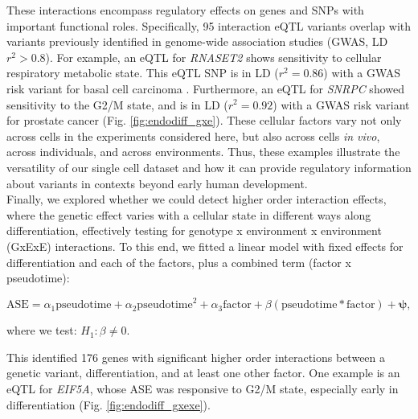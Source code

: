 These interactions encompass regulatory effects on genes and SNPs with important functional roles. Specifically, 95 interaction eQTL variants overlap with variants previously identified in genome-wide association studies (GWAS, LD $r^2>0.8$). 
For example, an eQTL for \textit{RNASET2} shows sensitivity to cellular respiratory metabolic state. 
This eQTL SNP is in LD ($r^2=0.86$) with a GWAS risk variant for basal cell carcinoma \cite{chahal2016genome}. Furthermore, an eQTL for \textit{SNRPC} showed sensitivity to the G2/M state, and is in LD ($r^2=0.92$) with a GWAS risk variant for prostate cancer \cite{schumacher2018association} (Fig. \ref{fig:endodiff_gxe}). 
These cellular factors vary not only across cells in the experiments considered here, but also across cells \textit{in vivo}, across individuals, and across environments. 
Thus, these examples illustrate the versatility of our single cell dataset and how it can provide regulatory information about variants in contexts beyond early human development.\\

Finally, we explored whether we could detect higher order interaction effects, where the genetic effect varies with a cellular state in different ways along differentiation, effectively testing for genotype x environment x environment (GxExE) interactions. 
To this end, we fitted a linear model with fixed effects for differentiation and each of the factors, plus a combined term (factor x pseudotime):

\begin{equation}
    \mathrm{ASE} = \alpha_1 \mathrm{pseudotime} + \alpha_2 \mathrm{pseudotime}^2 + \alpha_3\mathrm{factor} + \beta (\mathrm{pseudotime}*\mathrm{factor}) + \boldsymbol{\psi},
\end{equation}

where we test: $H_1: \beta \neq 0$.

This identified 176 genes with significant higher order interactions between a genetic variant, differentiation, and at least one other factor. 
One example is an eQTL for \textit{EIF5A}, whose ASE was responsive to G2/M state, especially early in differentiation (Fig. \ref{fig:endodiff_gxexe}). 

